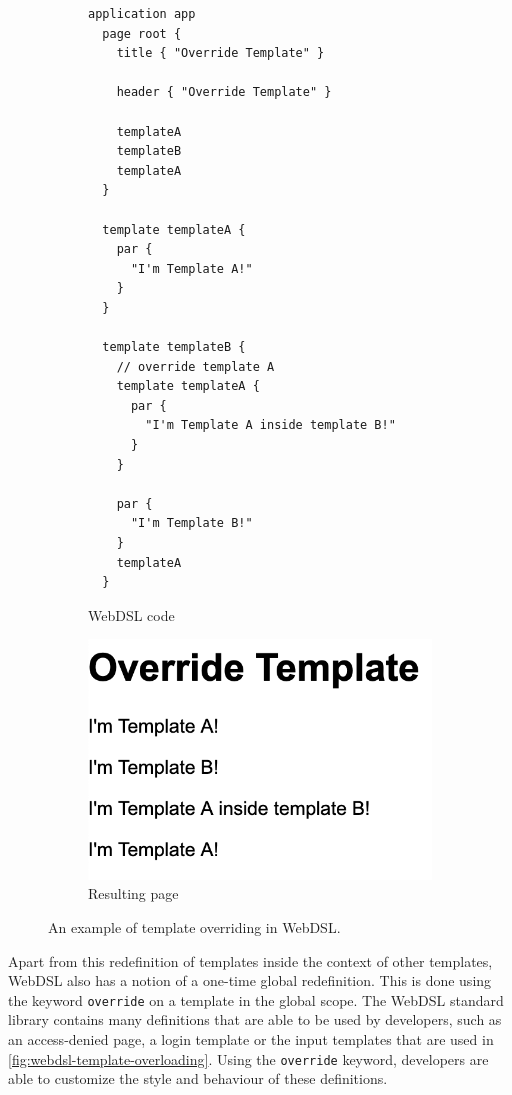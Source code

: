       \begin{figure}
        \begin{subfigure}[t]{0.45\textwidth}
          \begin{verbatim}
application app
  page root {
    title { "Override Template" }

    header { "Override Template" }

    templateA
    templateB
    templateA
  }

  template templateA {
    par {
      "I'm Template A!"
    }
  }

  template templateB {
    // override template A
    template templateA {
      par {
        "I'm Template A inside template B!"
      }
    }

    par {
      "I'm Template B!"
    }
    templateA
  }
          \end{verbatim}
          \caption{\label{fig:webdsl-template-overriding-webdsl}WebDSL code}
        \end{subfigure}
        \begin{subfigure}[t]{0.55\textwidth}
          \capstart
          \includegraphics[width=\textwidth]{../img/webdsl-template-overriding}
          \caption{\label{fig:webdsl-template-overriding-page}Resulting page}
        \end{subfigure}
      \caption{\label{fig:webdsl-template-overriding}An example of template overriding in WebDSL.}
      \end{figure}

      Apart from this redefinition of templates inside the context of other templates, WebDSL also has a notion of a one-time global redefinition. This is done using the keyword \texttt{override} on a template in the global scope. The WebDSL standard library contains many definitions that are able to be used by developers, such as an access-denied page, a login template or the input templates that are used in \cref{fig:webdsl-template-overloading}. Using the \texttt{override} keyword, developers are able to customize the style and behaviour of these definitions.

